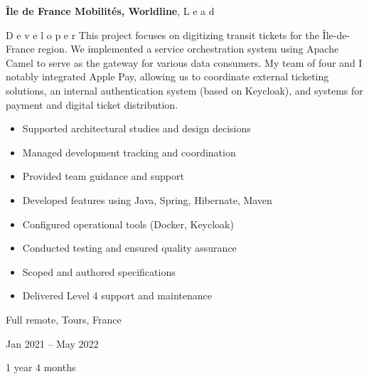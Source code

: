 \documentclass[10pt, letterpaper]{article}
\newenvironment{highlights}{
    \begin{itemize}[
        topsep=0.10 cm,
        parsep=0.10 cm,
        partopsep=0pt,
        itemsep=0pt,
        leftmargin=0.4 cm + 10pt
    ]
}{
    \end{itemize}
} %
\newenvironment{twocolentry}[2][]{
    \onecolentry
    \def\secondColumn{#2}
    \setcolumnwidth{\fill, 4.5 cm}
    \begin{paracol}{2}
}{
    \switchcolumn \raggedleft \secondColumn
    \end{paracol}
    \endonecolentry
} %
\begin{document}
        \begin{twocolentry}{
            Full remote, Tours, France

        Jan 2021 – May 2022

        1 year 4 months
        }
            \textbf{Île de France Mobilités, Worldline}, L
        e
        a
        d
         
        D
        e
        v
        e
        l
        o
        p
        e
        r 
            This project focuses on digitizing transit tickets for the Île-de-France region. We implemented a service orchestration system using Apache Camel to serve as the gateway for various data consumers. My team of four and I notably integrated Apple Pay, allowing us to coordinate external ticketing solutions, an internal authentication system (based on Keycloak), and systems for payment and digital ticket distribution.
            \begin{highlights}
                \item Supported architectural studies and design decisions
                \item Managed development tracking and coordination
                \item Provided team guidance and support
                \item Developed features using Java, Spring, Hibernate, Maven
                \item Configured operational tools (Docker, Keycloak)
                \item Conducted testing and ensured quality assurance
                \item Scoped and authored specifications
                \item Delivered Level 4 support and maintenance
            \end{highlights}
        \end{twocolentry}


        \vspace{0.2 cm}
\end{document}
